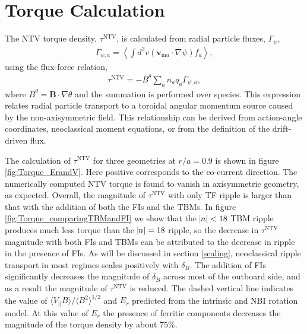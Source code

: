 \documentclass[aip, pop, preprint]{revtex4-1}
\begin{document}
\FloatBarrier

\section{Torque Calculation}\label{torque}

The NTV torque density, $\tau^{\mathrm{NTV}}$, is calculated from radial particle fluxes, $\Gamma_{\psi}$, 
\begin{gather}
\Gamma_{\psi,a} = \left \langle \int d^3v (\bm{v}_{\mathrm{m}a} \cdot \nabla \psi) f_a \right \rangle,
\label{eq:particleflux}
\end{gather}
using the flux-force relation,
\begin{gather}
\tau^{\mathrm{NTV}} = - B^{\theta} \sum_a n_a q_a \Gamma_{\psi, a},
\end{gather}
where $B^{\theta} = \bm{B} \cdot \nabla \theta$ and the summation is performed over species. This expression relates radial particle transport to a toroidal angular momentum source caused by the non-axisymmetric field. This relationship can be derived from action-angle coordinates,\cite{Albert2016} neoclassical moment equations,\cite{Shaing1986} or from the definition of the drift-driven flux.\cite{Shaing2006} 

The calculation of $\tau^{\mathrm{NTV}}$ for three geometries at $r/a = 0.9$ is shown in figure \ref{fig:Torque_ErandV}. Here positive corresponds to the co-current direction. The numerically computed NTV torque is found to vanish in axisymmetric geometry, as expected. Overall, the magnitude of $\tau^{\mathrm{NTV}}$ with only TF ripple is larger than that with the addition of both the FIs and the TBMs.  In figure \ref{fig:Torque_comparingTBMandFI} we show that the $\abs{n} < 18$ TBM  ripple produces much less torque than the $\abs{n} = 18$ ripple, so the decrease in $\tau^{\mathrm{NTV}}$ magnitude with both FIs and TBMs can be attributed to the decrease in ripple in the presence of FIs. As will be discussed in section \ref{scaling}, neoclassical ripple transport in most regimes scales positively with $\delta_B$. The addition of FIs significantly decreases the magnitude of $\delta_B$ across most of the outboard side, and as a result the magnitude of $\tau^{\mathrm{NTV}}$ is reduced. The dashed vertical line indicates the value of $\langle V_{||} B\rangle/\langle B^2 \rangle^{1/2}$ and $E_r$ predicted from the intrinsic and NBI rotation model. At this value of $E_r$ the presence of ferritic components decreases the magnitude of the torque density by about $75\%$. 
\end{document}
